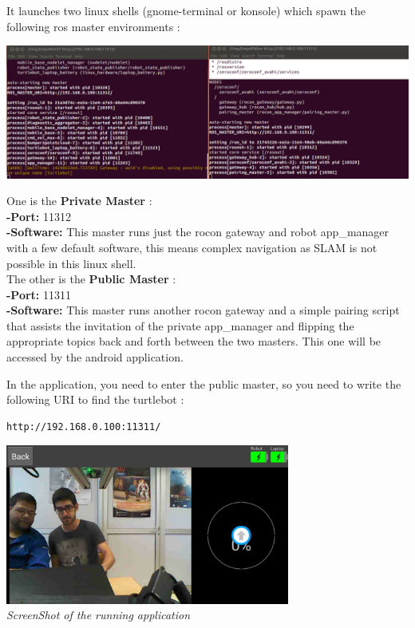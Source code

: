 \documentclass[10pt,a4paper]{article}
\begin{document}
It launches two linux shells (gnome-terminal or konsole) which spawn the following ros master environments : 

\begin{center}
\includegraphics[scale=0.4]{images/twoMasters.png}
\end{center}

One is the \textbf{Private Master} : \\
\textbf{-Port:} 11312 \\
\textbf{-Software:} This master runs just the rocon gateway and robot app\_manager with a few default software, this means complex navigation as SLAM is not possible in this linux shell.\\

The other is the \textbf{Public Master} : \\
\textbf{-Port:} 11311 \\
\textbf{-Software:} This master runs another rocon gateway and a simple pairing script that assists the invitation of the private app\_manager and flipping the appropriate topics back and forth between the two masters. This one will be accessed by the android application.

In the application, you need to enter the public master, so you need to write the following URI to find the turtlebot : 
\begin{lstlisting}[frame=single]
http://192.168.0.100:11311/ 
\end{lstlisting}

\begin{center}
\includegraphics[width=0.7\textwidth]{images/AndroidApp.png}\\
\textit{ScreenShot of the running application}\\
\end{center}
\end{document}
